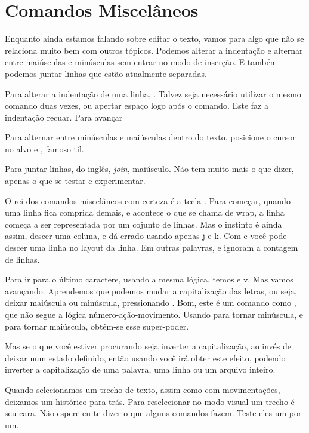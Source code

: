 \section{Comandos Miscelâneos}
Enquanto ainda estamos falando sobre editar o texto, vamos para algo que não se relaciona muito bem com outros tópicos.
Podemos alterar a indentação e alternar entre maiúsculas e minúsculas sem entrar no modo de inserção.
E também podemos juntar linhas que estão atualmente separadas.

Para alterar a indentação de uma linha, \vimcommand{$<$}.
Talvez seja necessário utilizar o mesmo comando duas vezes, ou apertar espaço logo após o comando.
Este faz a indentação recuar.
Para avançar \vimcommand{$>$}

Para alternar entre minúsculas e maiúsculas dentro do texto, posicione o cursor no alvo
e \vimcommand{\~}, famoso til. 

Para juntar linhas, do inglês, \textit{join},  maiúsculo.
Não tem muito mais o que dizer, apenas o que se testar e experimentar.

O rei dos comandos miscelâneos com certeza é a tecla .
Para começar, quando uma linha fica comprida demais, e acontece o que se chama de wrap,
a linha começa a ser representada por um cojunto de linhas.
Mas o instinto é ainda assim, descer uma coluna, e dá errado usando apenas j e k.
Com  e  você pode descer uma linha no layout da linha.
Em outras palavras,  e  ignoram a contagem de linhas.

Para ir para o último caractere, usando a mesma lógica, temos  e v.
Mas vamos avançando. Aprendemos que podemos mudar a capitalização das letras, ou seja,
deixar maiúscula ou minúscula, pressionando \vimcommand{\~}.
Bom, este é um comando como , que não segue a lógica número-ação-movimento.
Usando  para tornar minúscula, e  para tornar maiúscula,
obtém-se esse super-poder.

Mas se o que você estiver procurando seja inverter a capitalização, ao invés de
deixar num estado definido, então usando  você irá obter este
efeito, podendo inverter a capitalização de uma palavra, uma linha ou um
arquivo inteiro.

Quando selecionamos um trecho de texto, assim como com movimentações, deixamos um histórico para trás.
Para reselecionar no modo visual um trecho  é seu cara.
Não espere eu te dizer o que alguns comandos fazem. Teste eles um por um.

